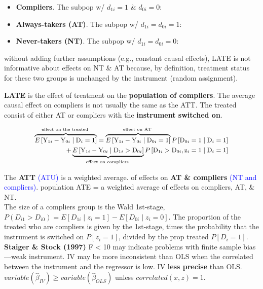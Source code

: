\documentclass[
]{article}
\providecommand{\tightlist}{%
  \setlength{\itemsep}{0pt}\setlength{\parskip}{0pt}}
\begin{document}
\begin{itemize}
\tightlist
\item
  \textbf{Compliers}. The subpop w/ \(d_{1i} = 1\) \& \(d_{0i} = 0\):
\item
  \textbf{Always-takers (AT)}. The subpop w/ \(d_{1i} =d_{0i} = 1\):
\item
  \textbf{Never-takers (NT)}. The subpop w/ \(d_{1i} =d_{0i} = 0\):
\end{itemize}

without adding further assumptions (e.g., constant causal effects), LATE
is not informative about effects on NT \& AT because, by definition,
treatment status for these two groups is unchanged by the instrument
(random assignment).

\textbf{LATE} is the effect of treatment on the \textbf{population of
compliers}. The average causal effect on compliers is not usually the
same as the ATT. The treated consist of either AT or compliers with the
\textbf{instrument switched on}.

\[\begin{small}
\begin{aligned}
\overbrace{E\left[\mathrm{Y}_{1 i}-\mathrm{Y}_{0 i} \mid \mathrm{D}_{i}=1\right]}^{\text {effect on the treated }}
= \overbrace{E\left[\mathrm{Y}_{1 i}-\mathrm{Y}_{0 i} \mid \mathrm{D}_{0 i}=1\right]}^{\text {effect on AT }}P\left[\mathrm{D}_{0 i}=1 \mid \mathrm{D}_{i}=1\right] \\
+ \underbrace{E\left[\mathrm{Y}_{1 i}-\mathrm{Y}_{0 i} \mid \mathrm{D}_{1 i}>\mathrm{D}_{0 i}\right]}_{\text {effect on compliers }}P\left[\mathrm{D}_{1 i}>\mathrm{D}_{0 i}, \mathrm{z}_{i}=1 \mid \mathrm{D}_{i}=1\right]
\end{aligned}
\end{small}\]

The \textbf{ATT} \textcolor{blue}{(ATU)} is a weighted average. of
effects on \textbf{AT \& compliers}
\textcolor{blue}{(NT and compliers)}. population ATE = a weighted
average of effects on compliers, AT, \& NT.\\
The size of a compliers group is the Wald 1st-stage,
\(P(D_{i1} > D_{i0})=E\left[D_{1 i} \mid z_i = 1\right] -E\left[D_{0 i}\mid z_{i}=0\right]\).
The proportion of the treated who are compliers is given by the
1st-stage, times the probability that the instrument is switched on
\(P[z_i =1]\), divided by the prop treated \(P[D_i = 1]\).\\
\textbf{Staiger \& Stock (1997)} F \textless{} 10 may indicate problems
with finite sample bias---weak instrument. IV may be more inconsistent
than OLS when the correlated between the instrument and the regressor is
low. IV \textbf{less precise} than OLS.
\(variable(\hat{\beta}_{IV})\ge variable(\hat{\beta}_{OLS})\) unless
\(correlated(x, z) = 1\).
\end{document}
